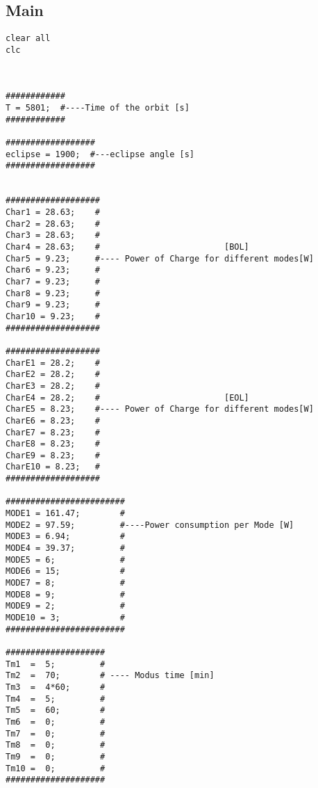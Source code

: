 
\begin{appendix}
	\section{Main}
	\lstset{breaklines=true}
\begin{lstlisting}
clear all
clc



############                                                
T = 5801;  #----Time of the orbit [s]                           
############                                                                     

##################                                                               
eclipse = 1900;  #---eclipse angle [s]                             
##################                                                                


###################                                                               
Char1 = 28.63;    #
Char2 = 28.63;    #   
Char3 = 28.63;    # 
Char4 = 28.63;    #                         [BOL]
Char5 = 9.23;     #---- Power of Charge for different modes[W]
Char6 = 9.23;     #
Char7 = 9.23;     #
Char8 = 9.23;     #
Char9 = 9.23;     #
Char10 = 9.23;    #               
################### 

###################                                                               
CharE1 = 28.2;    #
CharE2 = 28.2;    #   
CharE3 = 28.2;    # 
CharE4 = 28.2;    #                         [EOL]
CharE5 = 8.23;    #---- Power of Charge for different modes[W]
CharE6 = 8.23;    #
CharE7 = 8.23;    #
CharE8 = 8.23;    #
CharE9 = 8.23;    #
CharE10 = 8.23;   #               
################### 

########################
MODE1 = 161.47;        #
MODE2 = 97.59;         #----Power consumption per Mode [W]
MODE3 = 6.94;          #
MODE4 = 39.37;         #
MODE5 = 6;             #
MODE6 = 15;            #
MODE7 = 8;             #
MODE8 = 9;             #
MODE9 = 2;             #
MODE10 = 3;            #
########################                                                             

####################                                                               
Tm1  =  5;         #                                                                
Tm2  =  70;        # ---- Modus time [min]
Tm3  =  4*60;      #
Tm4  =  5;         #
Tm5  =  60;        # 
Tm6  =  0;         #
Tm7  =  0;         #
Tm8  =  0;         #
Tm9  =  0;         #
Tm10 =  0;         #
####################





\end{lstlisting}
\end{appendix}
